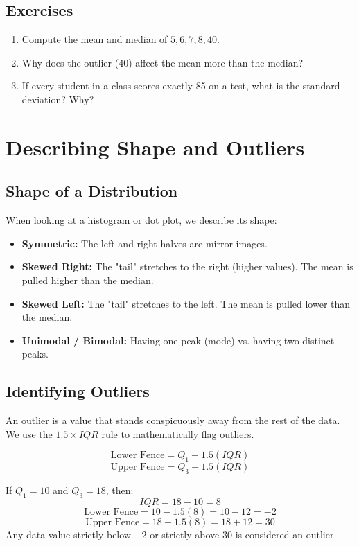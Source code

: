 \documentclass[11pt,openany]{book}
\begin{document}
\section{Exercises}
\begin{enumerate}
    \item Compute the mean and median of $5, 6, 7, 8, 40$.
    \item Why does the outlier (40) affect the mean more than the median?
    \item If every student in a class scores exactly 85 on a test, what is the standard deviation? Why?
\end{enumerate}

\chapter{Describing Shape and Outliers}

\section{Shape of a Distribution}
When looking at a histogram or dot plot, we describe its shape:
\begin{itemize}
    \item \textbf{Symmetric:} The left and right halves are mirror images.
    \item \textbf{Skewed Right:} The "tail" stretches to the right (higher values). The mean is pulled higher than the median.
    \item \textbf{Skewed Left:} The "tail" stretches to the left. The mean is pulled lower than the median.
    \item \textbf{Unimodal / Bimodal:} Having one peak (mode) vs. having two distinct peaks.
\end{itemize}

\section{Identifying Outliers}
An outlier is a value that stands conspicuously away from the rest of the data. We use the $1.5 \times IQR$ rule to mathematically flag outliers.

\[
\text{Lower Fence} = Q_1 - 1.5(IQR)
\]
\[
\text{Upper Fence} = Q_3 + 1.5(IQR)
\]

\begin{examplebox}
If $Q_1 = 10$ and $Q_3 = 18$, then:
\[
IQR = 18 - 10 = 8
\]
\[
\text{Lower Fence} = 10 - 1.5(8) = 10 - 12 = -2
\]
\[
\text{Upper Fence} = 18 + 1.5(8) = 18 + 12 = 30
\]
Any data value strictly below $-2$ or strictly above $30$ is considered an outlier.
\end{examplebox}
\end{document}

